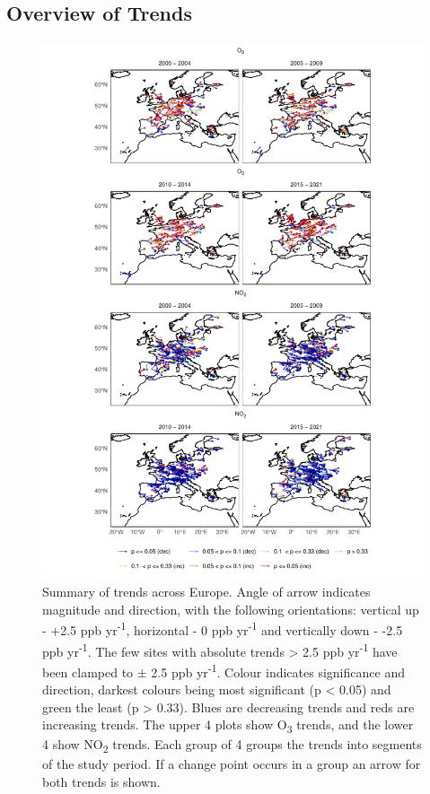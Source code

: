\documentclass[journal abbreviation, manuscript]{copernicus}
\begin{document}
\subsection{Overview of Trends} \label{sect:overview_of_trends}
\begin{figure}[p]
\includegraphics[width=12cm]{figures/f3_eu_arrows.pdf}
\caption{Summary of trends across Europe. Angle of arrow indicates magnitude and direction, with the following orientations: vertical up - +2.5 ppb yr\textsuperscript{-1}, horizontal - 0 ppb yr\textsuperscript{-1} and vertically down - -2.5 ppb yr\textsuperscript{-1}. The few sites with absolute trends > 2.5 ppb yr\textsuperscript{-1} have been clamped to $\pm$ 2.5 ppb yr\textsuperscript{-1}. Colour indicates significance and direction, darkest colours being most significant (p < 0.05) and green the least (p > 0.33). Blues are decreasing trends and reds are increasing trends. The upper 4 plots show O\textsubscript{3} trends, and the lower 4 show NO\textsubscript{2} trends. Each group of 4 groups the trends into segments of the study period. If a change point occurs in a group an arrow for both trends is shown.}

\label{fig:arrow_eu}
\end{figure}
\end{document}
